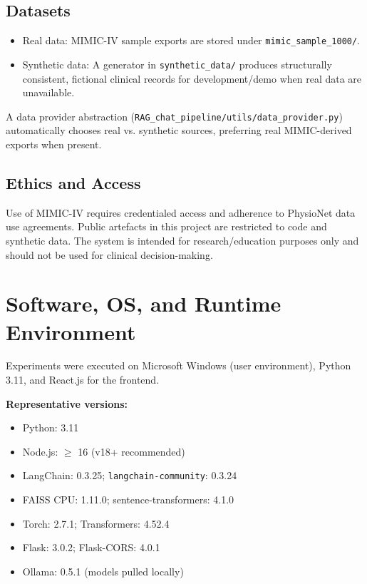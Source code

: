 \subsection{Datasets}
\begin{itemize}
  \item Real data: MIMIC-IV sample exports are stored under \texttt{mimic\_sample\_1000/}.
  \item Synthetic data: A generator in \texttt{synthetic\_data/} produces structurally consistent, fictional clinical records for development/demo when real data are unavailable.
\end{itemize}

\noindent A data provider abstraction (\texttt{RAG\_chat\_pipeline/utils/data\_provider.py}) automatically chooses real vs. synthetic sources, preferring real MIMIC-derived exports when present.

\subsection{Ethics and Access}
Use of MIMIC-IV requires credentialed access and adherence to PhysioNet data use agreements. Public artefacts in this project are restricted to code and synthetic data. The system is intended for research/education purposes only and should not be used for clinical decision-making.

\section{Software, OS, and Runtime Environment}
Experiments were executed on Microsoft Windows (user environment), Python 3.11, and React.js for the frontend.

\vspace{0.5em}
\noindent\textbf{Representative versions:}
\begin{itemize}
  \item Python: 3.11
  \item Node.js: \(\ge\) 16 (v18+ recommended)
  \item LangChain: 0.3.25; \texttt{langchain-community}: 0.3.24
  \item FAISS CPU: 1.11.0; sentence-transformers: 4.1.0
  \item Torch: 2.7.1; Transformers: 4.52.4
  \item Flask: 3.0.2; Flask-CORS: 4.0.1
  \item Ollama: 0.5.1 (models pulled locally)
\end{itemize}

